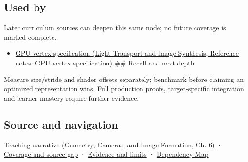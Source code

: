\subsection{Used by}\label{appendix-26bf6bf2fb8b-used-by}

Later curriculum sources can deepen this same node; no future coverage is marked complete.

\begin{itemize}
\tightlist
\item
  \href{../04-Light-Transport-and-Image-Synthesis/main.pdf\#nameddest=appendix-749ba51a6c25}{GPU vertex specification (Light Transport and Image Synthesis, Reference notes: GPU vertex specification)} \#\# Recall and next depth
\end{itemize}

Measure size/stride and shader offsets separately; benchmark before claiming an optimized representation wins. Full production proofs, target-specific integration and learner mastery require further evidence.

\subsection{Source and navigation}\label{appendix-26bf6bf2fb8b-source-and-navigation}

\href{../03-Geometry-Cameras-and-Image-Formation/main.pdf\#nameddest=02-foundations-ii-ch037-storage-and-computation-can-choose-different-layouts}{Teaching narrative (Geometry, Cameras, and Image Formation, Ch. 6)} · \hyperref[appendix-fd090d982a15-phase-6---parts-501-600]{Coverage and source gap} · \hyperref[appendix-a103e7846d21-phase-6---source-analysis-and-verification]{Evidence and limits} · \hyperref[appendix-4ad47bdd269a]{Dependency Map}
